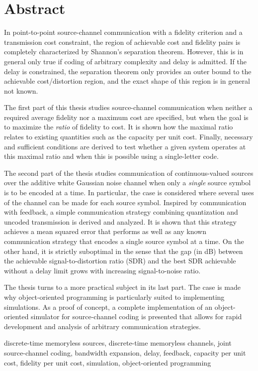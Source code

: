 \chapter*{Abstract}


In point-to-point source-channel communication with a fidelity criterion and a
transmission cost constraint, the region of achievable cost and fidelity pairs
is completely characterized by Shannon's separation theorem. However, this is in
general only true if coding of arbitrary complexity and delay is admitted. If
the delay is constrained, the separation theorem only provides an outer bound to
the achievable cost\slash distortion region, and the exact shape of this region
is in general not known.

The first part of this thesis studies source-channel communication when neither
a required average fidelity nor a maximum cost are specified, but when the goal
is to maximize the \emph{ratio} of fidelity to cost. It is shown how the
maximal ratio relates to existing quantities such as the capacity per unit cost.
Finally, necessary and sufficient conditions are derived to test whether a given
system operates at this maximal ratio and when this is possible using a
single-letter code. 

The second part of the thesis studies communication of continuous-valued
sources over the additive white Gaussian noise channel when only a \emph{single}
source symbol is to be encoded at a time. In particular, the case is considered
where several uses of the channel can be made for each source symbol. Inspired
by communication with feedback, a simple communication strategy combining
quantization and uncoded transmission is derived and analyzed. It is shown that
this strategy achieves a mean squared error that performs as well as any known
communication strategy that encodes a single source symbol at a time. On the
other hand, it is strictly suboptimal in the sense that the gap (in dB) between
the achievable signal-to-distortion ratio (SDR) and the best SDR achievable
without a delay limit grows with increasing signal-to-noise ratio. 

The thesis turns to a more practical subject in its last part. The case is made
why object-oriented programming is particularly suited to implementing
simulations. As a proof of concept, a complete implementation of an
object-oriented simulator for source-channel coding is presented that allows for
rapid development and analysis of arbitrary communication strategies.

\begin{keywords}
  discrete-time memoryless sources, discrete-time memoryless channels, joint
  source-channel coding, bandwidth expansion, delay, feedback, capacity per
  unit cost, fidelity per unit cost, simulation, object-oriented programming
\end{keywords}
